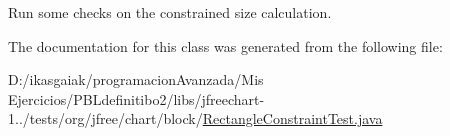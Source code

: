 Run some checks on the constrained size calculation. 

The documentation for this class was generated from the following file\+:\begin{DoxyCompactItemize}
\item 
D\+:/ikasgaiak/programacion\+Avanzada/\+Mis Ejercicios/\+P\+B\+Ldefinitibo2/libs/jfreechart-\/1../tests/org/jfree/chart/block/\mbox{\hyperlink{_rectangle_constraint_test_8java}{Rectangle\+Constraint\+Test.\+java}}\end{DoxyCompactItemize}
